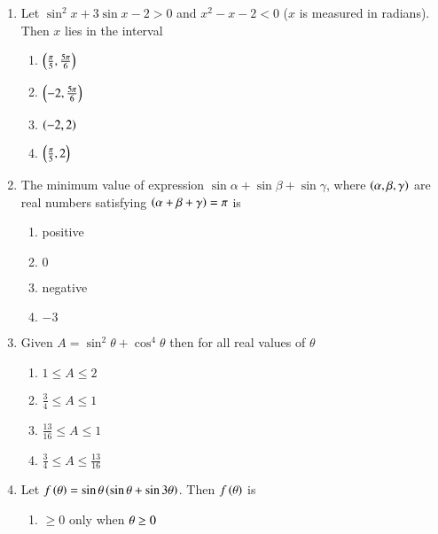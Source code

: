\begin{enumerate}[label=\thesubsection.\arabic*,ref=\thesubsection.\theenumi]
	\item Let $\sin^2x+3\sin x-2>0$ and $x^2-x-2<0$ ($x$ is measured in radians). Then $x$ lies in the interval
\hfill{}
\begin{multicols}{4}
\begin{enumerate}
\item $\left(\frac{\pi}{5},\frac{5\pi}{6}\right)$
\item $\left(-2,\frac{5\pi}{6}\right)$
\item $\left(-2,2\right)$
\item $\left(\frac{\pi}{5},2\right)$
\end{enumerate}
\end{multicols}
\item The minimum value of expression $\sin{\alpha} + \sin{\beta} + \sin{\gamma}$, where $\left(\alpha,\beta,\gamma\right)$ are real numbers satisfying $\left(\alpha+\beta+\gamma\right)=\pi$  is \hfill{}
\begin{multicols}{4}
\begin{enumerate}
    \item positive
    \item $0$
    \item negative 
    \item $-3$
\end{enumerate}
\end{multicols}
%  
%
	\item Given $A = \sin^{2}\theta + \cos^{4}\theta $ then for all real values of $\theta$ 
		\hfill{}
%  
		\begin{multicols}{4}
\begin{enumerate}
				\item $1 \le A \le2$
  				\item $\frac{3}{4} \le A\le 1$ 
				\item $\frac{13}{16} \le A\le 1$
				\item $\frac{3}{4} \le A\le \frac{13}{16}$ 
		\end{enumerate}
\end{multicols}
%
    \item Let $f\left(\theta\right) = \sin{\theta}\left(\sin{\theta} + \sin{3\theta}\right)$. Then $f\left(\theta\right)$ is
%        
        \hfill{}
        \begin{multicols}{2}
\begin{enumerate}
                \item $\ge0$ only when $\theta\newline\ge0$

\end{enumerate}
\end{multicols}
\end{enumerate}
